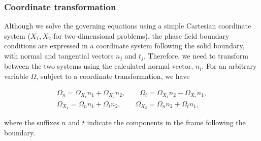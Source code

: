 \documentclass[review]{elsarticle}
\begin{document}
\subsubsection{Coordinate transformation} \label{Sec:CoordinateTransformation}
Although we solve the governing equations using a simple Cartesian coordinate system ($X_1, X_2$ for two-dimensional problems), the phase field boundary conditions are expressed in a coordinate system following the solid boundary, with normal and tangential vectors $n_j$ and $t_j$. Therefore, we need to transform between the two systems using the calculated normal vector, $n_i$. For an arbitrary variable $\Omega$, subject to a coordinate transformation, we have
 \begin{linenomath}\begin{equation} \label{CoordinateTransformation}
\begin{gathered}
\Omega_n = \Omega_{X_1} n_1+ \Omega_{X_2} n_2  , \quad  \quad  \Omega_t = \Omega_{X_1} n_2-\Omega_{X_2} n_1,  \\
 \Omega_{X_1} = \Omega_n n_1+ \Omega_t n_2  ,\quad \quad  \Omega_{X_2} = \Omega_n n_2+ \Omega_t n_1,
 \end{gathered}
\end{equation}\end{linenomath}
where the suffixes $n$ and $t$ indicate the components in the frame following the boundary.
\end{document}
